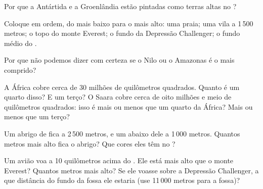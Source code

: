 \begin{exercise}[$\star$]\label{exo:g4:world-physical-map:6}
Por que a Antártida e a Groenlândia estão pintadas como terras altas no
?
\end{exercise}

\begin{exercise}[$\star\star$]\label{exo:g4:world-physical-map:7}
Coloque em ordem, do mais baixo para o mais alto: uma praia; uma vila a
1\,500 metros; o topo do monte Everest; o fundo da Depressão Challenger;
o fundo médio do .
\end{exercise}

\begin{exercise}[$\star\star$]\label{exo:g4:world-physical-map:8}
Por que não podemos dizer com certeza se o Nilo ou o Amazonas é o  mais
comprido?
\end{exercise}

\begin{exercise}[$\star\star$]\label{exo:g4:world-physical-map:9}
A África cobre cerca de 30 milhões de quilômetros quadrados. Quanto é um
quarto disso? E um terço? O Saara cobre cerca de oito milhões e meio de
quilômetros quadrados: isso é mais ou menos que um quarto da África? Mais
ou menos que um terço?
\end{exercise}

\begin{exercise}[$\star\star$]\label{exo:g4:world-physical-map:10}
Um abrigo de  fica a 2\,500 metros, e um  abaixo dele a 1\,000
metros. Quantos metros mais alto fica o abrigo? Que cores eles têm no ?
\end{exercise}

\begin{exercise}[$\star\star\star$]\label{exo:g4:world-physical-map:11}
Um avião voa a 10 quilômetros acima do . Ele está mais alto
que o monte Everest? Quantos metros mais alto? Se ele voasse sobre a
Depressão Challenger, a que distância do fundo da fossa ele estaria (use
11\,000 metros para a fossa)?
\end{exercise}
